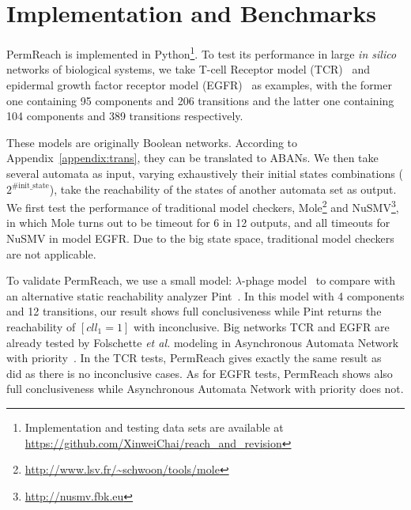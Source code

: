 \documentclass{article}
\theoremstyle{definition}
\begin{document}

\section{Implementation and Benchmarks}\label{sect:5}
PermReach is implemented in Python\footnote{Implementation and testing data sets are available at \url{https://github.com/XinweiChai/reach_and_revision}}. 
To test its performance in large \textit{in silico} networks of biological systems, we take T-cell Receptor model (TCR)~\cite{saez2007logical} and epidermal growth factor receptor model (EGFR)~\cite{samaga2009logic} as examples, with the former one containing 95 components and 206 transitions and the latter one containing 104 components and 389 transitions respectively. 

These models are originally Boolean networks.
According to Appendix~\ref{appendix:trans}, they can be translated to ABANs. We then take several automata as input, varying exhaustively their initial states combinations ($2^{\mathrm{\#init\_state}}$), take the reachability of the states of another automata set as output.
We first test the performance of traditional model checkers, Mole\footnote{\url{http://www.lsv.fr/~schwoon/tools/mole}} and NuSMV\footnote{\url{http://nusmv.fbk.eu}}, in which Mole turns out to be timeout for 6 in 12 outputs, and all timeouts for NuSMV in model EGFR.
Due to the big state space, traditional model checkers are not applicable. 

To validate PermReach, we use a small model: $\lambda$-phage model~\cite{thieffry1995dynamical} to compare with an alternative static reachability analyzer Pint~\cite{pauleve2012}. In this model with 4 components and 12 transitions, our result shows full conclusiveness while Pint returns the reachability of $[cll_1=1]$ with inconclusive.
Big networks TCR and EGFR are already tested by Folschette \textit{et al.} modeling in Asynchronous Automata Network with priority~\cite{folschette2015}. 
In the TCR tests, PermReach gives exactly the same result as~\cite{folschette2015} did as there is no inconclusive cases. As for EGFR tests, PermReach shows also full conclusiveness while Asynchronous Automata Network with priority does not.
\end{document}
